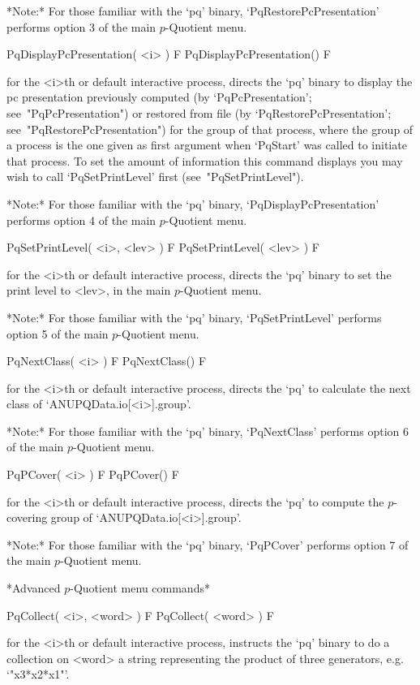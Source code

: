 *Note:*
For  those  familiar  with  the  `pq'  binary,  `PqRestorePcPresentation'
performs option 3 of the main $p$-Quotient menu.

\>PqDisplayPcPresentation( <i> ) F
\>PqDisplayPcPresentation() F

for the <i>th or default interactive {\ANUPQ} process, directs  the  `pq'
binary  to  display  the  pc   presentation   previously   computed   (by
`PqPcPresentation'; see~"PqPcPresentation") or  restored  from  file  (by
`PqRestorePcPresentation'; see~"PqRestorePcPresentation") for  the  group
of that process, where the group of a process is the one given  as  first
argument when `PqStart' was called to initiate that process. To  set  the
amount of  information  this  command  displays  you  may  wish  to  call
`PqSetPrintLevel' first (see~"PqSetPrintLevel").

*Note:*
For  those  familiar  with  the  `pq'  binary,  `PqDisplayPcPresentation'
performs option 4 of the main $p$-Quotient menu.

\>PqSetPrintLevel( <i>, <lev> ) F
\>PqSetPrintLevel( <lev> ) F

for the <i>th or default interactive {\ANUPQ} process, directs  the  `pq'
binary to set the print level to <lev>, in the main $p$-Quotient menu.

*Note:* For  those  familiar  with  the  `pq'  binary,  `PqSetPrintLevel'
performs option 5 of the main $p$-Quotient menu.

\>PqNextClass( <i> ) F
\>PqNextClass() F

for the <i>th or default interactive {\ANUPQ} process, directs  the  `pq'
to calculate the next class of `ANUPQData.io[<i>].group'. 

*Note:* For those familiar with the `pq' binary,  `PqNextClass'  performs
option 6 of the main $p$-Quotient menu.

\>PqPCover( <i> ) F
\>PqPCover() F

for the <i>th or default interactive {\ANUPQ} process, directs  the  `pq'
to compute the $p$-covering group of `ANUPQData.io[<i>].group'.

*Note:* For those familiar with  the  `pq'  binary,  `PqPCover'  performs
option 7 of the main $p$-Quotient menu.

*Advanced $p$-Quotient menu commands*

\>PqCollect( <i>, <word> ) F
\>PqCollect( <word> ) F

for the <i>th or default interactive {\ANUPQ} process, instructs the `pq'
binary to do a collection on <word> a string representing the product  of
three generators, e.g. `"x3*x2*x1"'.


